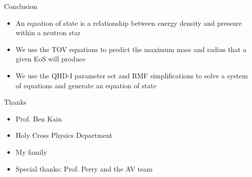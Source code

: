 \documentclass[]{beamer}
\begin{document}
    \begin{frame}{Conclusion}
        \begin{itemize}
            \item An equation of state is a relationship between energy density and pressure within a neutron star \pause
            \item We use the TOV equations to predict the maximum mass and radius that a given EoS will produce \pause
            \item We use the QHD-I parameter set and RMF simplifications to solve a system of equations and generate an equation of state
        \end{itemize}
    \end{frame}

    \begin{frame}{Thanks}
        \begin{itemize}
            \item Prof. Ben Kain \pause
            \item Holy Cross Physics Department \pause
            \item My family \pause
            \item Special thanks: Prof. Perry and the AV team
        \end{itemize}
    \end{frame}
\end{document}

